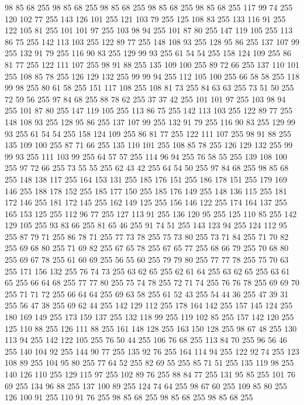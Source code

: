 98 85 68 255 98 85 68 255 98 85 68 255 98 85 68 255 98 85 68 255 117 99 74 255 120 102 77 255 143 126 101 255 121 103 79 255 125 108 83 255 133 116 91 255 122 105 81 255 101 101 97 255 103 98 94 255 101 87 80 255 147 119 105 255 113 86 75 255 142 113 103 255 122 89 77 255 148 108 93 255 128 95 86 255 137 107 99 255 132 91 79 255 116 90 83 255 129 99 93 255 61 54 54 255 158 124 109 255 86 81 77 255 122 111 107 255 98 91 88 255 135 109 100 255 89 72 66 255 137 110 101 255 108 85 78 255 126 129 132 255 99 99 94 255 112 105 100 255 66 58 58 255 118 99 98 255 80 61 58 255 151 117 108 255 108 81 73 255 84 63 63 255 73 51 50 255 72 59 56 255 97 84 68 255 88 78 62 255 37 37 42 255 101 101 97 255 103 98 94 255 101 87 80 255 147 119 105 255 113 86 75 255 142 113 103 255 122 89 77 255 148 108 93 255 128 95 86 255 137 107 99 255 132 91 79 255 116 90 83 255 129 99 93 255 61 54 54 255 158 124 109 255 86 81 77 255
122 111 107 255 98 91 88 255 135 109 100 255 87 71 66 255 135 110 101 255 108 85 78 255 126 129 132 255 99 99 93 255 111 103 99 255 64 57 57 255 114 96 94 255 76 58 55 255 139 108 100 255 97 72 66 255 73 55 55 255 62 43 42 255 64 54 50 255 97 84 68 255 98 85 68 255 148 138 117 255 164 153 131 255 185 176 151 255 186 178 151 255 179 169 146 255 188 178 152 255 185 177 150 255 185 176 149 255 148 136 115 255 181 172 146 255 181 172 145 255 162 149 125 255 156 146 122 255 174 164 137 255 165 153 125 255 112 96 77 255 127 113 91 255 136 120 95 255 125 110 85 255 142 129 105 255 93 83 66 255 81 65 46 255 91 74 51 255 143 123 94 255 124 112 95 255 87 79 71 255 86 78 71 255 77 73 78 255 75 73 80 255 73 71 84 255 71 70 82 255 69 68 80 255 71 69 82 255 67 65 78 255 67 65 77 255 68 66 79 255 70 68 80 255 69 67 78 255 61 60 69 255 56 55 60 255 79 79 80 255 77 77 78 255 75 70 63 255 171 156 132 255 76 74 73 255
63 62 65 255 62 61 64 255 63 62 65 255 63 61 65 255 66 64 68 255 77 77 80 255 75 74 78 255 72 71 74 255 76 76 78 255 69 69 70 255 71 71 72 255 66 64 64 255 69 63 58 255 61 52 43 255 54 44 36 255 47 39 31 255 56 47 38 255 69 62 44 255 142 129 112 255 178 164 142 255 157 145 124 255 180 169 149 255 173 159 137 255 132 118 99 255 119 102 85 255 157 142 120 255 125 110 88 255 126 111 88 255 161 148 128 255 163 150 128 255 98 67 48 255 130 113 94 255 142 122 105 255 76 50 44 255 106 76 68 255 113 84 70 255 96 56 46 255 140 104 92 255 144 90 77 255 135 92 76 255 164 114 94 255 122 92 74 255 123 108 89 255 104 95 80 255 77 64 52 255 82 69 55 255 85 71 51 255 135 119 98 255 140 126 110 255 129 115 97 255 102 89 76 255 88 84 77 255 131 95 85 255 101 76 69 255 134 96 88 255 137 100 89 255 124 74 64 255 98 67 60 255 109 85 80 255 126 100 91 255 110 91 76 255 98 85 68 255 98 85 68 255 98 85 68 255
